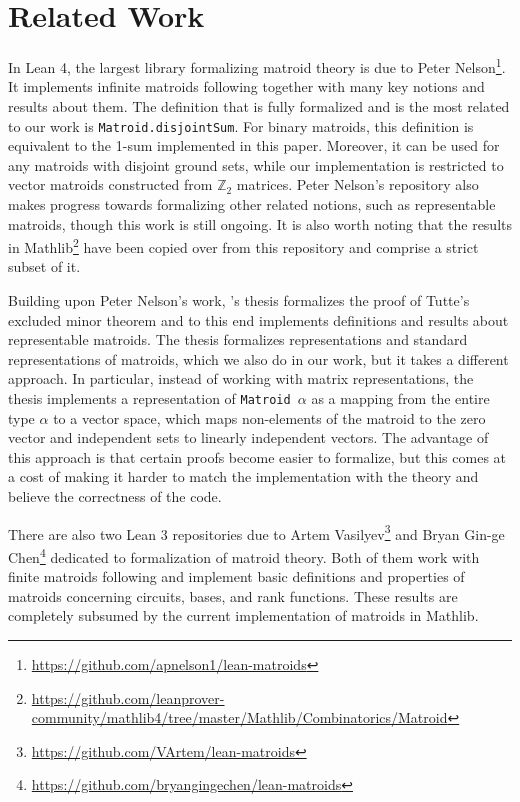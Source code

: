 \section{Related Work}

In Lean 4, the largest library formalizing matroid theory is due to Peter Nelson\footnote{\url{https://github.com/apnelson1/lean-matroids}}. %
It implements infinite matroids following \cite{Bruhn2013} together with many key notions and results about them. The definition that is fully formalized and is the most related to our work is \texttt{Matroid.disjointSum}. For binary matroids, this definition is equivalent to the 1-sum implemented in this paper. Moreover, it can be used for any matroids with disjoint ground sets, while our implementation is restricted to vector matroids constructed from $\mathbb{Z}_{2}$ matrices. Peter Nelson's repository also makes progress towards formalizing other related notions, such as representable matroids, though this work is still ongoing. It is also worth noting that the results in Mathlib\footnote{\url{https://github.com/leanprover-community/mathlib4/tree/master/Mathlib/Combinatorics/Matroid}} have been copied over from this repository and comprise a strict subset of it.

Building upon Peter Nelson's work, \citeauthor{Gusakov2024}'s thesis \cite{Gusakov2024} formalizes the proof of Tutte's excluded minor theorem and to this end implements definitions and results about representable matroids. The thesis formalizes representations and standard representations of matroids, which we also do in our work, but it takes a different approach. In particular, instead of working with matrix representations, the thesis implements a representation of \texttt{Matroid $\alpha$} as a mapping from the entire type $\alpha$ to a vector space, which maps non-elements of the matroid to the zero vector and independent sets to linearly independent vectors. The advantage of this approach is that certain proofs become easier to formalize, but this comes at a cost of making it harder to match the implementation with the theory and believe the correctness of the code.

There are also two Lean 3 repositories due to Artem Vasilyev\footnote{\url{https://github.com/VArtem/lean-matroids}} and Bryan Gin-ge Chen\footnote{\url{https://github.com/bryangingechen/lean-matroids}} dedicated to formalization of matroid theory. Both of them work with finite matroids following \cite{Oxley2011} and implement basic definitions and properties of matroids concerning circuits, bases, and rank functions. These results are completely subsumed by the current implementation of matroids in Mathlib.

